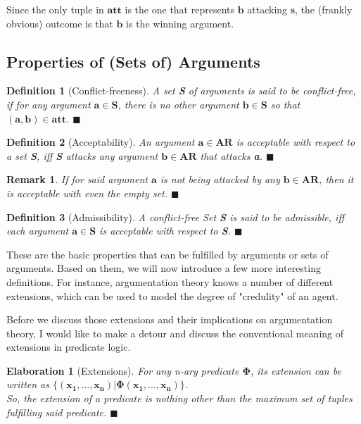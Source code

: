 \documentclass[12pt]{report}
\numberwithin{figure}{chapter}
\theoremstyle{break}
\newtheorem{defn}{Definition}[chapter]
\newtheorem{elab}{Elaboration}[chapter]
\newtheorem*{frmrk}{Remark}
\newenvironment{mydefn}{\begin{defn}}{$\blacksquare$ \end{defn}}
\newenvironment{myelab}{\begin{elab}}{$\blacksquare$ \end{elab}}
\newenvironment{myfrmrk}{\begin{frmrk}}{$\blacksquare$ \end{frmrk}}
\begin{document}
Since the only tuple in $\bm{att}$ is the one that represents $\bm{b}$ attacking $\bm{s}$, the (frankly obvious) outcome is that $\bm{b}$ is the winning argument.

\subsection{Properties of (Sets of) Arguments}

\begin{mydefn}[Conflict-freeness]
A set \textbf{S} of arguments is said to be conflict-free, if for any argument $\bm{a \in S}$, there is no other argument $\bm{b \in S}$ so that $\bm{(a,b) \in att}$.
\end{mydefn}

\begin{mydefn}[Acceptability]
An argument $\bm{a \in AR}$ is acceptable with respect to a set \textbf{S}, iff \textbf{S} attacks any argument $\bm{b \in AR}$ that attacks \textbf{a}. 
\end{mydefn}

\begin{myfrmrk}
If for said argument $\bm{a}$ is not being attacked by any $\bm{b \in AR}$, then it is acceptable with even the empty set.
\end{myfrmrk}

\begin{mydefn}[Admissibility]
A conflict-free Set \textbf{S} is said to be admissible, iff each argument $\bm{a \in S}$ is acceptable with respect to \textbf{S}.
\label{admissible}
\end{mydefn}

These are the basic properties that can be fulfilled by arguments or sets of arguments. Based on them, we will now introduce a few more interesting definitions.
For instance, argumentation theory knows a number of different extensions, which can be used to model the degree of "credulity" of an agent.

Before we discuss those extensions and their implications on argumentation theory, I would like to make a detour and discuss the conventional meaning of extensions in predicate logic.

\newpage

\begin{myelab}[Extensions]
For any n-ary predicate $\bm{\Phi}$, its extension can be written as $\bm{\{(x_{1},...,x_{n})|\Phi(x_{1},...,x_{n})\}}$.\\
So, the extension of a predicate is nothing other than the maximum set of tuples \\ fulfilling said predicate.
\end{myelab}
\end{document}
